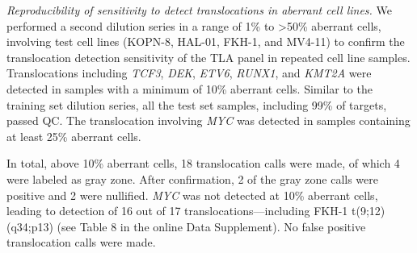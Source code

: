 \hfill %

\noindent\textsl{Reproducibility of sensitivity to detect translocations in aberrant cell lines.}
We performed a second dilution series in a range of 1\% to \textgreater 50\% aberrant cells, involving test cell lines (KOPN-8, HAL-01, FKH-1, and MV4-11) to confirm the translocation detection sensitivity of the TLA panel in repeated cell line samples. 
Translocations including \textsl{TCF3}, \textsl{DEK}, \textsl{ETV6}, \textsl{RUNX1}, and \textsl{KMT2A} were detected in samples with a minimum of 10\% aberrant cells. 
Similar to the training set dilution series, all the test set samples, including 99\% of targets, passed QC. 
The translocation involving \textsl{MYC} was detected in samples containing at least 25\% aberrant cells. 

In total, above 10\% aberrant cells, 18 translocation calls were made, of which 4 were labeled as gray zone. 
After confirmation, 2 of the gray zone calls were positive and 2 were nullified. 
\textsl{MYC} was not detected at 10\% aberrant cells, leading to detection of 16 out of 17 translocations—including FKH-1 t(9;12)(q34;p13) (see Table 8 in the online Data Supplement). 
No false positive translocation calls were made.


